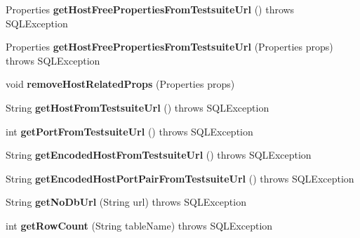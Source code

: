 \begin{DoxyCompactItemize}
Properties {\bfseries get\+Host\+Free\+Properties\+From\+Testsuite\+Url} ()  throws S\+Q\+L\+Exception 
\item 
\mbox{\label{classtestsuite_1_1_base_test_case_af5813dd273ec517ee7393be19e26c3e7}} 
Properties {\bfseries get\+Host\+Free\+Properties\+From\+Testsuite\+Url} (Properties props)  throws S\+Q\+L\+Exception 
\item 
\mbox{\label{classtestsuite_1_1_base_test_case_a5ca1f452f4a88327c0d35a85f1322d46}} 
void {\bfseries remove\+Host\+Related\+Props} (Properties props)
\item 
\mbox{\label{classtestsuite_1_1_base_test_case_a1b58f06989895f6eef650ebfd9d5a5e5}} 
String {\bfseries get\+Host\+From\+Testsuite\+Url} ()  throws S\+Q\+L\+Exception 
\item 
\mbox{\label{classtestsuite_1_1_base_test_case_a9d6bd0f4c3628800fb4b39ba3c9c77f6}} 
int {\bfseries get\+Port\+From\+Testsuite\+Url} ()  throws S\+Q\+L\+Exception 
\item 
\mbox{\label{classtestsuite_1_1_base_test_case_a7fe9be098761a2a4be2015159cc28c38}} 
String {\bfseries get\+Encoded\+Host\+From\+Testsuite\+Url} ()  throws S\+Q\+L\+Exception 
\item 
\mbox{\label{classtestsuite_1_1_base_test_case_a73146c2e50648aff4fba85d64d2113ec}} 
String {\bfseries get\+Encoded\+Host\+Port\+Pair\+From\+Testsuite\+Url} ()  throws S\+Q\+L\+Exception 
\item 
\mbox{\label{classtestsuite_1_1_base_test_case_a06e75a59b8ce3e4d6a70ac7a50c4dad4}} 
String {\bfseries get\+No\+Db\+Url} (String url)  throws S\+Q\+L\+Exception 
\item 
\mbox{\label{classtestsuite_1_1_base_test_case_a6a6e1d72f46dd17581da3f719a72417a}} 
int {\bfseries get\+Row\+Count} (String table\+Name)  throws S\+Q\+L\+Exception 
\item 
\mbox{\label{classtestsuite_1_1_base_test_case_a0cafe07cb8206e968a45d675446f2e48}} 

\end{DoxyCompactItemize}

